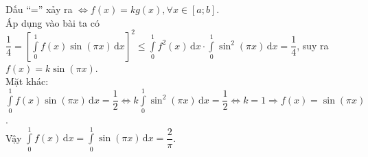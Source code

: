 \begin{ex}
{\begin{itemize}
			Dấu “=” xảy ra $\Leftrightarrow f(x)=kg(x),\forall x\in \left[a;b\right]$.\\
			Áp dụng vào bài ta có\\ $\dfrac{1}{4}=\left[\displaystyle\int\limits_0^1 {f(x)\sin \left(\pi x\right)\mathrm{\,d}x}\right]^2\leqslant \displaystyle\int\limits_0^1 {f^2(x)\mathrm{\,d}x}\cdot \displaystyle\int\limits_0^1 {{\sin}^2\left(\pi x\right)\mathrm{\,d}x}=\dfrac{1}{4}$,
			suy ra $f(x)=k\sin \left(\pi x\right)$.\\
			Mặt khác: $\displaystyle\int\limits_0^1 {f(x)\sin \left(\pi x\right)\mathrm{\,d}x}=\dfrac{1}{2}\Leftrightarrow k\displaystyle\int\limits_0^1 {{\sin}^2\left(\pi x\right)\mathrm{\,d}x}=\dfrac{1}{2}\Leftrightarrow k=1\Rightarrow f(x)=\sin \left(\pi x\right)$.\\
			Vậy $\displaystyle\int\limits_0^1 {f(x)\mathrm{\,d}x}=\displaystyle\int\limits_0^1 {\sin \left(\pi x\right)\mathrm{\,d}x}=\dfrac{2}{\pi}$.
		\end{itemize}
		
		
	}
\end{ex}
